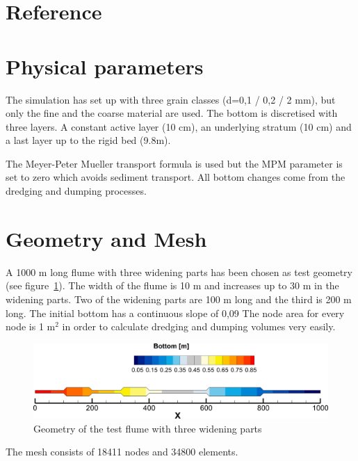 %
%
\section{Reference}
%

%
%
\section{Physical parameters}
%
The simulation has set up with three grain classes (d=0,1 / 0,2 / 2 mm), but only the fine and the coarse material
are used. The bottom is discretised with three layers. A constant active layer (10 cm), an underlying stratum (10 cm)
and a last layer up to the rigid bed (9.8m).

The Meyer-Peter Mueller transport formula is used but the MPM parameter is set to zero which avoids sediment transport.
All bottom changes come from the dredging and dumping processes.
%
%
\section{Geometry and Mesh}
%
A 1000 m long flume with three widening parts has been chosen as test geometry (see figure~\ref{ini}).
The width of the flume is 10 m and increases up to 30 m in the widening parts.
Two of the widening parts are 100 m long and the third is 200 m long.
The initial bottom has a continuous slope of 0,09 %
The node area for every node is 1 m$^2$ in order to calculate dredging and dumping volumes very easily.

\begin{figure} [!h]
\centering
\includegraphics[scale=0.15]{ini_bottom.png}
 \caption{Geometry of the test flume with three widening parts}\label{ini}
\end{figure}
The mesh consists of 18411 nodes and 34800 elements.

